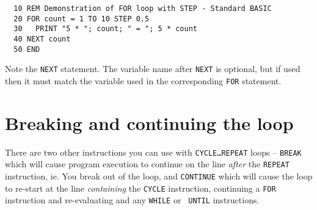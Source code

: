 \begin{verbatim}
  10 REM Demonstration of FOR loop with STEP - Standard BASIC
  20 FOR count = 1 TO 10 STEP 0.5 
  30   PRINT "5 * "; count; " = "; 5 * count
  40 NEXT count
  50 END
\end{verbatim}

Note the {\tt NEXT} statement. The variable name after
{\tt NEXT} is optional, but if used then it must match the variable used
in the corresponding {\tt FOR} statement.

\section{Breaking and continuing the loop}
There are two other instructions you can use with {\tt CYCLE\dots REPEAT}
loops -- {\tt BREAK} which will cause program execution to continue on
the line {\em after} the {\tt REPEAT} instruction, ie. You break out
of the loop, and {\tt CONTINUE} which will cause the loop to re-start
at the line {\em containing} the {\tt CYCLE} instruction, continuing
a {\tt FOR} instruction and re-evaluating and any {\tt WHILE} or {\tt
UNTIL} instructions.
